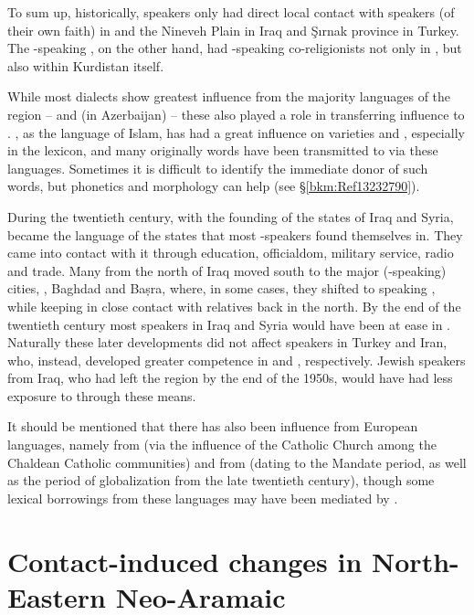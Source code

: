 \documentclass[output=paper]{langsci/langscibook}
\begin{document}
To sum up, historically,   speakers only had direct local contact with  speakers (of their own faith) in  and the Nineveh Plain in Iraq and Şırnak province in Turkey. The -speaking , on the other hand, had -speaking co-religionists not only in , but also within  Kurdistan itself.

While most  dialects show greatest influence from the majority languages of the region –  and (in  Azerbaijan)   – these also played a role in transferring  influence to . , as the language of Islam, has had a great influence on  varieties and , especially in the lexicon, and many originally  words have been transmitted to  via these languages. Sometimes it is difficult to identify the immediate donor of such words, but phonetics and morphology can help (see §\ref{bkm:Ref13232790}).

During the twentieth century, with the founding of the states of Iraq and Syria,  became the language of the states that most -speakers found themselves in. They came into contact with it through education, officialdom, military service, radio and trade. Many  from the north of Iraq moved south to the major (-speaking) cities, , Baghdad and Baṣra, where, in some cases, they shifted to speaking , while keeping in close contact with relatives back in the north. By the end of the twentieth century most  speakers in Iraq and Syria would have been at ease in . Naturally these later developments did not affect speakers in Turkey and Iran, who, instead, developed greater competence in  and , respectively. Jewish speakers from Iraq, who had left the region by the end of the 1950s, would have had less exposure to  through these means.

It should be mentioned that there has also been influence from European languages, namely from  (via the influence of the Catholic Church among the Chaldean Catholic communities) and from  (dating to the  Mandate period, as well as the period of globalization from the late twentieth century), though some lexical borrowings from these languages may have been mediated by .


\section{Contact-induced changes in North-Eastern Neo-Aramaic}
\end{document}

